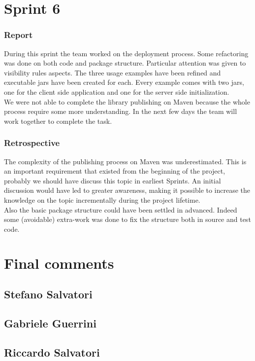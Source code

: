 \section{Sprint 6}

\subsubsection{Report}

During this sprint the team worked on the deployment process. Some refactoring was done on both code and package structure. Particular attention was given to visibility rules aspects.
The three usage examples have been refined and executable jars have been created for each. Every example comes with two jars, one for the client side application and one for the server side initialization.
\\
We were not able to complete the library publishing on Maven because the whole process require some more understanding.
In the next few days the team will work together to complete the task.



\subsubsection{Retrospective}


The complexity of the publishing process on Maven was underestimated.
This is an important requirement that existed from the beginning of the project, probably we should have discuss this topic in earliest Sprints. 
An initial discussion would have led to greater awareness, making it possible to increase the knowledge on the topic incrementally during the project lifetime.
\\
Also the basic package structure could have been settled in advanced. 
Indeed some (avoidable) extra-work was done to fix the structure both in source and test code.

\section{Final comments}
\subsection{Stefano Salvatori}
\subsection{Gabriele Guerrini}
\subsection{Riccardo Salvatori}